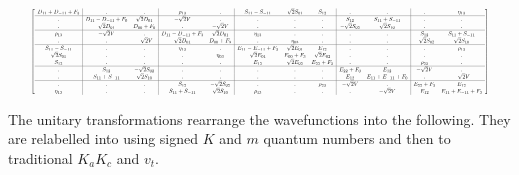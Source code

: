 \documentclass{article}
\begin{document}
\begin{equation*}
\resizebox{.95 \textwidth}{!}
{$
\left[
\begin{array}{c|cc|cc|ccc|cc|cc}
	D_{11} +  D_{-11} +  F_{3} &.&.&  \rho_{13} &.&  S_{11} -  S_{-11} & \sqrt{2}S_{01} &  S_{12} &.&.&.&  \eta_{13} \\
	\hline
	.&  D_{11} -  D_{-11} +  F_{0} & \sqrt{2}D_{01} &  - \sqrt{2}V &.&.&.&.&  S_{12} &  S_{11} +  S_{-11} &.&.\\
	.& \sqrt{2}D_{01} & D_{00} + F_{0} &.&  - \sqrt{2}V &.&.&.&  - \sqrt{2}S_{02} & \sqrt{2}S_{10} &.&.\\
	\hline
	\rho_{13} &  - \sqrt{2}V &.&  D_{11} -  D_{-11} +  F_{3} & \sqrt{2}D_{01} &  \eta_{13} &.&.&.&.&  S_{12} &  S_{11} +  S_{-11} \\
	.&.&  - \sqrt{2}V & \sqrt{2}D_{01} &  D_{00} +  F_{3} &.&\eta_{03}&.&.&.&  - \sqrt{2}S_{02} & \sqrt{2}S_{10} \\
	\hline
	S_{11} -  S_{-11} &.&.&  \eta_{13} &.&  E_{11} -  E_{-11} +  F_{3} & \sqrt{2}E_{01} &  E_{12} &.&.&.&  \rho_{13} \\
	\sqrt{2}S_{01} &.&.&.&\eta_{03}& \sqrt{2}E_{01} &  E_{00} +  F_{3} & \sqrt{2}E_{02} &.&.&.&.\\
	S_{12} &.&.&.&.&  E_{12} & \sqrt{2}E_{02} &  E_{22} +  F_{3} &.&.&  \rho_{23} &.\\
	\hline
	.&  S_{12} &  - \sqrt{2}S_{02} &.&.&.&.&.&  E_{22} +  F_{0} &  E_{12} &  - \sqrt{2}V &.\\
	.&  S_{11} +  S_{-11} & \sqrt{2}S_{10} &.&.&.&.&.&  E_{12} &  E_{11} +  E_{-11} +  F_{0} &.&  - \sqrt{2}V \\
	\hline
	.&.&.&  S_{12} &  - \sqrt{2}S_{02} &.&.&  \rho_{23} &  - \sqrt{2}V &.&  E_{22} +  F_{3} &  E_{12} \\
	\eta_{13} &.&.&  S_{11} +  S_{-11} & \sqrt{2}S_{10} &  \rho_{13} &.&.&.&  - \sqrt{2}V &  E_{12} &  E_{11} +  E_{-11} +  F_{3} \\
\end{array}
\right]
$}
\end{equation*}

\newpage

The unitary transformations rearrange the wavefunctions into the following. They are relabelled into using signed $K$ and $m$ quantum numbers and then to traditional $K_{a}K_{c}$ and $v_{t}$.
\end{document}
